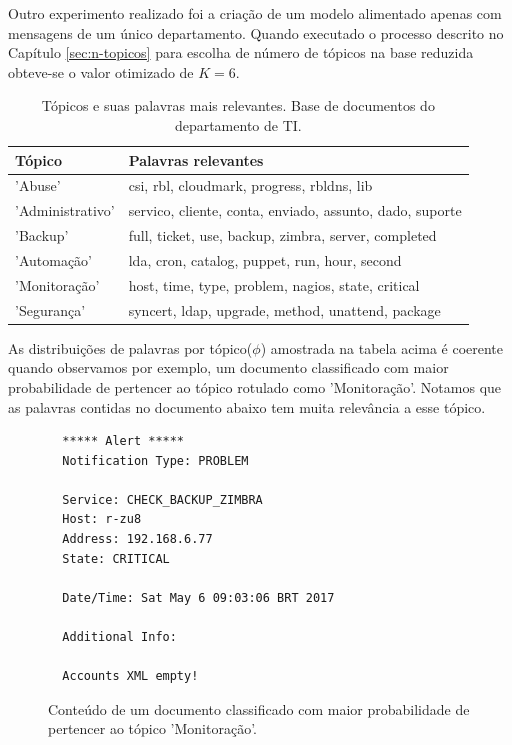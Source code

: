 \documentclass[12pt,a4paper]{article}
\begin{document}
Outro experimento realizado foi a criação de um modelo alimentado apenas com mensagens de um único departamento.
 Quando executado o processo descrito no Capítulo \ref{sec:n-topicos} para escolha de número de tópicos na base reduzida obteve-se o valor otimizado de $K=6$.

\begin{table}[H]
  \centering
  \begin{tabular}{ll}
  Tópico                   & Palavras relevantes \\
  \hline
  'Abuse'                    & csi, rbl, cloudmark, progress, rbldns, lib \\
  'Administrativo'           & servico, cliente, conta, enviado, assunto, dado, suporte \\
  'Backup'                   & full, ticket, use, backup, zimbra, server, completed  \\
  'Automação'                & lda, cron, catalog, puppet, run, hour, second \\
  'Monitoração'              & host, time, type, problem, nagios, state, critical \\
  'Segurança'                & syncert, ldap, upgrade, method, unattend, package \\
  \hline
  \end{tabular}
  \caption{Tópicos e suas palavras mais relevantes. Base de documentos do departamento de TI.}
  \label{tab-nich-topics}
\end{table}

As distribuições de palavras por tópico($\phi$) amostrada na tabela acima é coerente quando observamos por exemplo, um documento classificado com maior
 probabilidade de pertencer ao tópico rotulado como 'Monitoração'. Notamos que as palavras contidas no documento abaixo tem muita relevância a esse tópico.


\begin{figure}[H]
  \scriptsize
  \begin{verbatim}
  ***** Alert *****
  Notification Type: PROBLEM

  Service: CHECK_BACKUP_ZIMBRA
  Host: r-zu8
  Address: 192.168.6.77
  State: CRITICAL

  Date/Time: Sat May 6 09:03:06 BRT 2017

  Additional Info:

  Accounts XML empty!
  \end{verbatim}
  \normalsize
  \caption{Conteúdo de um documento classificado com maior probabilidade de pertencer ao tópico 'Monitoração'.}
  \label{mo}
\end{figure}
\end{document}
